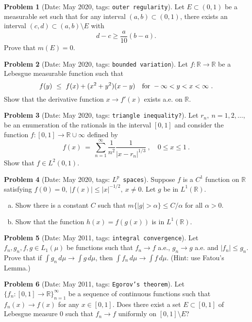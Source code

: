 \documentclass[11pt, notitlepage]{article}
\theoremstyle{definition}
\theoremstyle{definition}
\theoremstyle{definition}
\newtheorem{probstate}{Problem}
\theoremstyle{remark}
\newenvironment{problem}[2]{
    \begin{probstate}[Date: #1, tags: \texttt{#2}]
}
{
  \end{probstate}
}
\newcommand{\R}{\mathbb{R}}
\begin{document}
\begin{problem}{May 2020}{outer regularity}
  Let $E \subset (0,1)$ be a measurable set such that for any interval $(a,b) \subset (0,1)$, there exists an interval $(c,d) \subset (a,b) \setminus E$ with
 \[
  d-c \ge \frac{a}{10} (b-a).
 \]
 Prove that $m(E)=0$.

\end{problem}

\begin{problem}{May 2020}{bounded variation}
  Let $f:\mathbb{R}\to\mathbb{R}$ be a Lebesgue measurable function such that
$$
f(y) \ \le \ f(x)+(x^2+y^2)(x-y) \quad {\rm for \ } -\infty<y<x<\infty \ .
$$
Show that the derivative function $x\to f'(x)$ exists a.e. on $\mathbb{R}$.
\end{problem}

\begin{problem}{May 2020}{triangle inequality?}
  Let $r_n, \ n=1,2,\ldots,$ be an enumeration of the rationals in the interval $[0,1]$ and consider the function  $f:[0,1]\to\mathbb{R}\cup{\infty}$ defined by
$$
f(x) \ = \ \sum_{n=1}^\infty \frac{1}{n^2}\frac{1}{|x-r_n|^{1/3}} \ , \quad 0\le x\le 1 \ .
$$
Show that $f\in L^2(0,1)$.
\end{problem}


\begin{problem}{May 2020}{$L^p$ spaces}
Suppose $f$ is a $C^1$ function on $\mathbb{R}$ satisfying $f(0)=0, \ |f(x)|\le |x|^{-1/2}, \ x\ne 0$. Let $g$ be in  $L^1(\mathbb{R})$.
\begin{enumerate}[(a)]
\item Show there is a constant $C$ such that $m\{|g|>\alpha\}\le C/\alpha$ for all $\alpha>0$.

\item Show that the function $h(x)=f(g(x))$ is in $L^1(\mathbb{R})$.
\end{enumerate}
\end{problem}

\begin{problem}{May 2011}{integral convergence}
  Let $f_n,g_n,f,g \in L_1(\mu)$ be functions such that
    $f_n \to f$ a.e., $g_n \to g$ a.e. and $|f_n| \le g_n$. Prove
    that if $\int g_n \, d \mu \to \int g \, d \mu$, then
    $\int f_n \, d \mu \to \int f \, d \mu$.
    (Hint: use Fatou's Lemma.)
\end{problem}

\begin{problem}{May 2011}{Egorov's theorem}
  Let $\{f_n: [0,1] \to \R\}_{n=1}^\infty$ be a sequence of continuous functions
     such that $f_n(x) \to f(x)$ for any $x \in [0,1]$. Does there
     exist a set $E \subset [0,1]$ of Lebesgue measure 0 such that
     $f_n \to f$ uniformly on $[0,1] \setminus E$?
\end{problem}
\end{document}
